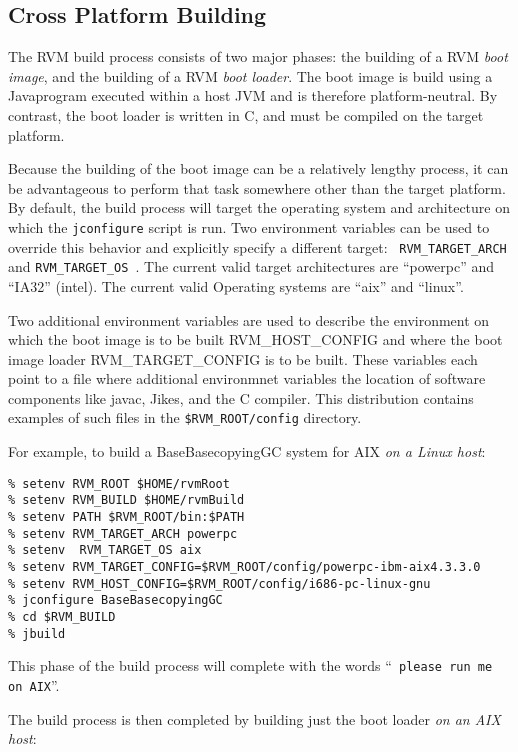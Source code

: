 \subsection{Cross Platform Building}

The RVM build process consists of two major phases: the building of a
RVM {\em boot image}, and the building of a RVM {\em boot loader}.
The boot image is build using a Java\trademark program executed within a host
JVM and is therefore platform-neutral.  By contrast, the boot loader
is written in C, and must be compiled on the target platform.

Because the building of the boot image can be a relatively lengthy
process, it can be advantageous to perform that task somewhere other
than the target platform.  By default, the build process will target
the operating system and architecture on which the {\tt jconfigure}
script is run.  
    Two environment variables can be used to
override this behavior and explicitly specify a different target: {\tt
  RVM\_TARGET\_ARCH } and {\tt RVM\_TARGET\_OS }. The current valid target
architectures are ``powerpc'' and ``IA32'' (intel). The current valid
Operating systems are ``aix'' and ``linux''.

    Two additional environment variables are used to describe the 
environment on which the boot image is to be built RVM\_HOST\_CONFIG  and where
the boot image loader  RVM\_TARGET\_CONFIG is to be built. These variables
each point to a file where additional environmnet variables the location
of software components like javac, Jikes\trademark, and the C compiler. This distribution
contains examples of such files in the {\tt \$RVM\_ROOT/config} directory.   

For example, to build a BaseBasecopyingGC system for AIX {\em on a Linux
host}:
\begin{verbatim}
% setenv RVM_ROOT $HOME/rvmRoot
% setenv RVM_BUILD $HOME/rvmBuild
% setenv PATH $RVM_ROOT/bin:$PATH
% setenv RVM_TARGET_ARCH powerpc
% setenv  RVM_TARGET_OS aix
% setenv RVM_TARGET_CONFIG=$RVM_ROOT/config/powerpc-ibm-aix4.3.3.0
% setenv RVM_HOST_CONFIG=$RVM_ROOT/config/i686-pc-linux-gnu
% jconfigure BaseBasecopyingGC
% cd $RVM_BUILD
% jbuild
\end{verbatim}

This phase of the build process will complete with the words ``{\tt
  please run me on AIX}''.


The build process is then completed by building just the boot loader {\em
  on an AIX host}:

